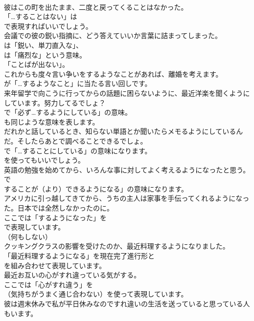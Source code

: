 \documentclass[8pt]{extreport}
\begin{document}
\begin{CJK}{UTF8}{min}
\\	彼はこの町を出たまま、二度と戻ってくることはなかった。 
\\	「…することはない」は 
\\	で表現すればいいでしょう。	
\\	会議での彼の鋭い指摘に、どう答えていいか言葉に詰まってしまった。 
\\	は「鋭い、単刀直入な」、
\\	は「痛烈な」という意味。
\\	「ことばが出ない」。	
\\	これからも度々言い争いをするようなことがあれば、離婚を考えます。 
\\	が「…するようなこと」に当たる言い回しです。	
\\	来年留学で向こうに行ってからの話題に困らないように、最近洋楽を聞くようにしています。努力してるでしょ？ 
\\	で「必ず…するようにしている」の意味。
\\	も同じような意味を表します。	
\\	だれかと話しているとき、知らない単語とか聞いたらメモるようにしているんだ。そしたらあとで調べることできるでしょ。 
\\	で「…することにしている」の意味になります。
\\	を使ってもいいでしょう。	
\\	英語の勉強を始めてから、いろんな事に対してよく考えるようになったと思う。 
\\	で
\\	することが（より）できるようになる」の意味になります。	
\\	アメリカに引っ越してきてから、うちの主人は家事を手伝ってくれるようになった。日本では全然しなかったのに。 
\\	ここでは「するようになった」を 
\\	で表現しています。
\\	（何もしない）	
\\	クッキングクラスの影響を受けたのか、最近料理するようになりました。 
\\	「最近料理するようになる」を現在完了進行形と 
\\	を組み合わせて表現しています。	
\\	最近お互いの心がすれ違っている気がする。 
\\	ここでは「心がすれ違う」を
\\	（気持ちがうまく通じ合わない）を使って表現しています。	
\\	彼は週末休みで私が平日休みなのですれ違いの生活を送っていると思っている人もいます。 

\end{CJK}
\end{document}
